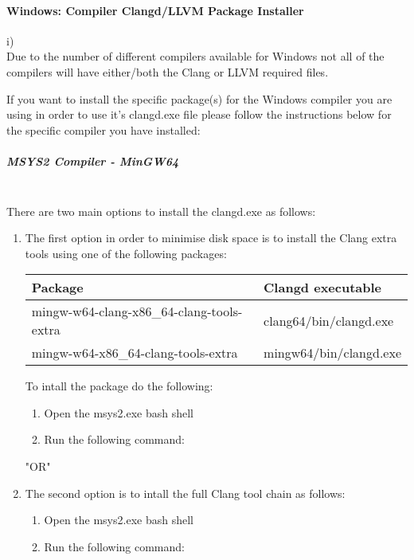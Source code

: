 \paragraph*{Windows: Compiler Clangd/LLVM Package Installer}\label{sec:win_packages}         i) \\
   Due to the number of different compilers available for Windows not all of the compilers will have either/both 
   the Clang or LLVM required files.

   If you want to install the specific package(s) for the Windows compiler you are using in order to use it's clangd.exe file please follow the instructions below for the specific compiler you have installed:

   \subparagraph*{MSYS2 Compiler - MinGW64} \hspace{0pt} \\
   There are two main options to install the clangd.exe as follows:
   \begin{enumerate}[noitemsep]
   \item The first option in order to  minimise disk space is to install the Clang extra tools using one of the following packages:       
        {\footnotesize
        \begin{longtable}{|l|l|}\hline
        \textbf{Package}                            & \textbf{Clangd executable}    \\ \hline
        mingw-w64-clang-x86\_64-clang-tools-extra   & clang64/bin/clangd.exe        \\
        mingw-w64-x86\_64-clang-tools-extra         & mingw64/bin/clangd.exe        \\ \hline
        \end{longtable}
        \par}
 
        To intall the package do the following:
        \begin{enumerate}[noitemsep]
        \item Open the msys2.exe bash shell 
        \item Run the following command: \newline
               \newline
        \end{enumerate}

       "OR" \newline

    \item The second option is to intall the full Clang tool chain as follows:
        \begin{enumerate}[noitemsep]
        \item Open the msys2.exe bash shell 
        \item Run the following command:
        \end{enumerate}
    \end{enumerate}

